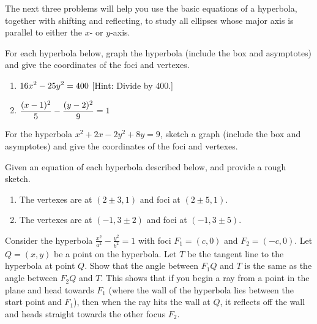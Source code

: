 The next three problems will help you use the basic equations of a hyperbola, together with shifting and reflecting, to study all ellipses whose major axis is parallel to either the $x$- or $y$-axis. 

\begin{problem} 
%
For each hyperbola below, graph the hyperbola (include the box and asymptotes) and give the coordinates of the foci and vertexes. 
\begin{enumerate}
\item $\displaystyle 16x^2-25y^2=400$ [Hint: Divide by 400.]
\item $\displaystyle \frac{(x-1)^2}{5}-\frac{(y-2)^2}{9}=1$
\end{enumerate}
\end{problem}

\begin{problem}
For the hyperbola $x^2+2x-2y^2+8y=9$, sketch a graph (include the box and asymptotes) and give the coordinates of the foci and vertexes. 
\end{problem}

\begin{problem} 
%
Given an equation of each hyperbola described below, and provide a rough sketch.
\begin{enumerate}
\item The vertexes are at $(2\pm 3,1)$ and foci at $(2\pm 5, 1)$.
\item The vertexes are at $(-1,3\pm 2)$ and foci at $(-1, 3\pm 5)$.
\end{enumerate}
\end{problem}


\begin{problem*}[Optional]
Consider the hyperbola $\frac{x^2}{a^2}-\frac{y^2}{b^2}=1$ with foci $F_1=(c,0)$ and $F_2=(-c,0)$. 
Let $Q=(x,y)$ be a point on the hyperbola. 
Let $T$ be the tangent line to the hyperbola at point $Q$. 
Show that the angle between $F_1Q$ and $T$ is the same as the angle between $F_2Q$ and $T$. This shows that if you begin a ray from a point in the plane and head towards $F_1$ (where the wall of the hyperbola lies between the start point and $F_1$), then when the ray hits the wall at $Q$, it reflects off the wall and heads straight towards the other focus $F_2$.
\end{problem*}







